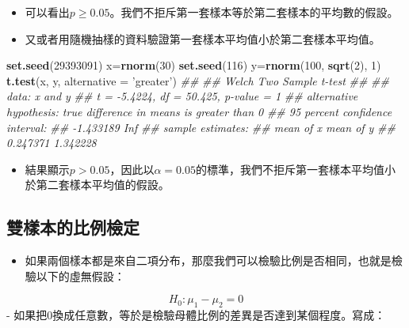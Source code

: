 \documentclass[hyperref,]{ctexart}
\newenvironment{Shaded}{\begin{snugshade}}{\end{snugshade}}
\newcommand{\CommentTok}[1]{\textcolor[rgb]{0.56,0.35,0.01}{\textit{#1}}}
\newcommand{\DataTypeTok}[1]{\textcolor[rgb]{0.13,0.29,0.53}{#1}}
\newcommand{\DecValTok}[1]{\textcolor[rgb]{0.00,0.00,0.81}{#1}}
\newcommand{\KeywordTok}[1]{\textcolor[rgb]{0.13,0.29,0.53}{\textbf{#1}}}
\newcommand{\NormalTok}[1]{#1}
\newcommand{\StringTok}[1]{\textcolor[rgb]{0.31,0.60,0.02}{#1}}
\providecommand{\tightlist}{%
  \setlength{\itemsep}{0pt}\setlength{\parskip}{0pt}}
\begin{document}
\begin{itemize}
\item
  可以看出\(p\geq 0.05\)。我們不拒斥第一套樣本等於第二套樣本的平均數的假設。
\item
  又或者用隨機抽樣的資料驗證第一套樣本平均值小於第二套樣本平均值。
\end{itemize}

\begin{Shaded}
\begin{Highlighting}[]
\KeywordTok{set.seed}\NormalTok{(}\DecValTok{29393091}\NormalTok{)}
\NormalTok{x=}\KeywordTok{rnorm}\NormalTok{(}\DecValTok{30}\NormalTok{)}
\KeywordTok{set.seed}\NormalTok{(}\DecValTok{116}\NormalTok{)}
\NormalTok{y=}\KeywordTok{rnorm}\NormalTok{(}\DecValTok{100}\NormalTok{, }\KeywordTok{sqrt}\NormalTok{(}\DecValTok{2}\NormalTok{), }\DecValTok{1}\NormalTok{)}
\KeywordTok{t.test}\NormalTok{(x, y, }\DataTypeTok{alternative =} \StringTok{'greater'}\NormalTok{)}
\CommentTok{## }
\CommentTok{##  Welch Two Sample t-test}
\CommentTok{## }
\CommentTok{## data:  x and y}
\CommentTok{## t = -5.4224, df = 50.425, p-value = 1}
\CommentTok{## alternative hypothesis: true difference in means is greater than 0}
\CommentTok{## 95 percent confidence interval:}
\CommentTok{##  -1.433189       Inf}
\CommentTok{## sample estimates:}
\CommentTok{## mean of x mean of y }
\CommentTok{##  0.247371  1.342228}
\end{Highlighting}
\end{Shaded}

\begin{itemize}
\tightlist
\item
  結果顯示\(p>0.05\)，因此以\(\alpha=0.05\)的標準，我們不拒斥第一套樣本平均值小於第二套樣本平均值的假設。
\end{itemize}

\hypertarget{ux96d9ux6a23ux672cux7684ux6bd4ux4f8bux6aa2ux5b9a}{%
\subsection{雙樣本的比例檢定}\label{ux96d9ux6a23ux672cux7684ux6bd4ux4f8bux6aa2ux5b9a}}

\begin{itemize}
\tightlist
\item
  如果兩個樣本都是來自二項分布，那麼我們可以檢驗比例是否相同，也就是檢驗以下的虛無假設：
\end{itemize}

\[H_{0}:\mu_{1}-\mu_{2}=0\] -
如果把0換成任意數，等於是檢驗母體比例的差異是否達到某個程度。寫成：
\end{document}
